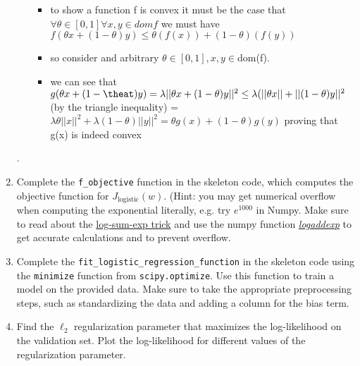 \documentclass{article}
\theoremstyle{plain}
\theoremstyle{definition}
\begin{document}
\begin{enumerate}
\begin{itemize}
    \begin{itemize}
        \item to show a function f is convex it must be the case that $\forall \theta\in [0,1] \forall x,y\in dom f$ we must have $f(\theta x +(1-\theta)y)\leq \theta(f(x))+(1-\theta)(f(y))$
        \item so consider and arbitrary $\theta \in [0,1] ,x,y\in $dom(f). 
        \item we can see that $g(\theta x + (1-\theat) y)=\lambda||\theta x+ (1-\theta)y||^2\leq \lambda (||\theta x||+ ||(1-\theta)y||^2 $ (by the triangle inequality) = $\lambda \theta ||x||^2+ \lambda (1-\theta)||y||^2=\theta g(x)+(1-\theta)g(y)$ proving that g(x) is indeed convex
    \end{itemize}
\end{itemize}
.

\item Complete the \texttt{f\_objective} function in the skeleton code,
which computes the objective function for $J_{\text{logistic}}(w)$.
(Hint: you may get numerical overflow when computing the exponential literally,
e.g. try $e^{1000}$ in Numpy.
Make sure to read about the
\href{https://blog.feedly.com/tricks-of-the-trade-logsumexp/}{log-sum-exp trick}
and use the numpy function
\textit{ \href{https://docs.scipy.org/doc/numpy/reference/generated/numpy.logaddexp.html}{logaddexp}
}
to get accurate calculations
and to prevent overflow.

\item Complete the \texttt{fit\_logistic\_regression\_function} in the skeleton
code using the \texttt{minimize} function from \texttt{scipy.optimize}.
Use this function to train
a model on the provided data. Make sure to take the appropriate preprocessing
steps, such as standardizing the data and adding a column for the
bias term. 

\item Find the $\ell_{2}$ regularization parameter that maximizes the log-likelihood
on the validation set. Plot the log-likelihood for different values
of the regularization parameter. 


\end{enumerate}
\end{document}
